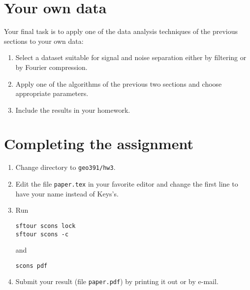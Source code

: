 

\section{Your own data}

Your final task is to apply one of the data analysis techniques of the
previous sections to your own data:
\begin{enumerate}
\item Select a dataset suitable for signal and noise separation either 
      by filtering or by Fourier compression.
\item Apply one of the algorithms of the previous two sections and choose
  appropriate parameters.
\item Include the results in your homework.
\end{enumerate}

\newpage

\section{Completing the assignment}

\begin{enumerate}
\item Change directory to \verb#geo391/hw3#.
\item Edit the file \texttt{paper.tex} in your favorite editor and change the
  first line to have your name instead of Keys's.
\item Run
\begin{verbatim}
sftour scons lock
sftour scons -c
\end{verbatim}
and
\begin{verbatim}
scons pdf
\end{verbatim}
\item Submit your result (file \texttt{paper.pdf}) by printing it out
  or by e-mail.
\end{enumerate}



